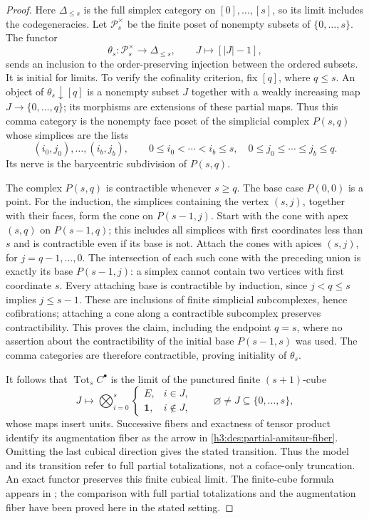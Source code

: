 \begin{proof}
Here $\Delta_{\leq s}$ is the full simplex category on
$[0],\ldots,[s]$, so its limit includes the codegeneracies.
Let $\mathcal P_s^\times$ be the finite poset of nonempty subsets of
$\{0,\ldots,s\}$.  The functor
\[
 \theta_s:\mathcal P_s^\times\longrightarrow\Delta_{\leq s},
 \qquad J\longmapsto[|J|-1],
\]
sends an inclusion to the order-preserving injection between the
ordered subsets.  It is initial for limits.  To verify the cofinality
criterion, fix $[q]$, where $q\leq s$.  An object of
$\theta_s\downarrow[q]$ is a nonempty subset $J$ together with a
weakly increasing map $J\to\{0,\ldots,q\}$; its morphisms are
extensions of these partial maps.  Thus this comma category is the
nonempty face poset of the simplicial complex $P(s,q)$ whose simplices
are the lists
\[
 (i_0,j_0),\ldots,(i_b,j_b),\qquad
 0\leq i_0<\cdots<i_b\leq s,
 \quad 0\leq j_0\leq\cdots\leq j_b\leq q.
\]
Its nerve is the barycentric subdivision of $P(s,q)$.

The complex $P(s,q)$ is contractible whenever $s\geq q$.
The base case $P(0,0)$ is a point.  For the induction, the simplices
containing the vertex $(s,j)$, together with their faces, form the
cone on $P(s-1,j)$.
Start with the cone with apex $(s,q)$ on $P(s-1,q)$; this includes
all simplices with first coordinates less than $s$ and is
contractible even if its base is not.  Attach the cones with apices
$(s,j)$, for $j=q-1,\ldots,0$.  The intersection of each such cone
with the preceding union is exactly its base $P(s-1,j)$: a simplex
cannot contain two vertices with first coordinate $s$.
Every attaching base is contractible by induction, since
$j<q\leq s$ implies $j\leq s-1$.  These are inclusions of finite
simplicial subcomplexes, hence cofibrations; attaching a cone along a
contractible subcomplex preserves contractibility.  This proves the
claim, including the endpoint $q=s$, where no assertion about the
contractibility of the initial base $P(s-1,s)$ was used.  The comma
categories are therefore contractible, proving initiality of
$\theta_s$.

It follows that $\operatorname{Tot}_s C^\bullet$ is the limit of the
punctured finite $(s+1)$-cube
\[
 J\longmapsto\bigotimes_{i=0}^s
   \begin{cases}E,&i\in J,\\ \mathbf1,&i\notin J,\end{cases}
 \qquad \varnothing\ne J\subseteq\{0,\ldots,s\},
\]
whose maps insert units.  Successive fibers and exactness of tensor
product identify its augmentation fiber as the arrow in
\eqref{h3:des:partial-amitsur-fiber}.  Omitting the last cubical
direction gives the stated transition.  Thus the model and its
transition refer to full partial totalizations, not a coface-only
truncation.  An exact functor preserves this finite cubical limit.
The finite-cube formula appears in \cite[Proposition~2.14]{MNN2017};
the comparison with full partial totalizations and the augmentation
fiber have been proved here in the stated setting.


\end{proof}
